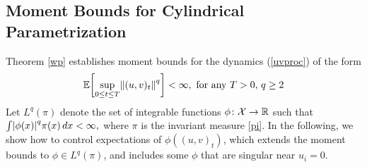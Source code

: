\documentclass[11pt, twoside]{report}
\begin{document}
\subsection{Moment Bounds for Cylindrical Parametrization}
Theorem \ref{wp} establishes moment bounds for the dynamics (\ref{uvproc}) of the form
\begin{equation} \label{uv_moment}
    \mean{\sup_{0\le t\le T} \norm{(u,v)_t}^q}<\infty,\text{ for any }T>0, \, q\ge 2
\end{equation}
Let $L^q(\pi)$ denote the set of integrable functions $\phi\colon\mathcal X\to\mathbb{R}$ such that $\int \abs{\phi(x)}^q \pi(x)\,dx<\infty,$ where $\pi$ is the invariant measure \ref{pi}. In the following,  we show how to control expectations of $\phi((u,v)_t)$, which extends the moment bounds to $\phi\in L^q(\pi)$, and includes some $\phi$ that are singular near $u_i=0$.
\end{document}
